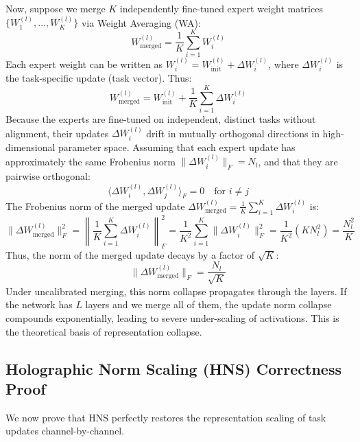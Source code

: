\documentclass{article}
\theoremstyle{plain}
\theoremstyle{definition}
\theoremstyle{remark}
\begin{document}
Now, suppose we merge $K$ independently fine-tuned expert weight matrices $\{W_1^{(l)}, \dots, W_K^{(l)}\}$ via Weight Averaging (WA):
\begin{equation}
  W_{\text{merged}}^{(l)} = \frac{1}{K} \sum_{i=1}^K W_i^{(l)}
\end{equation}
Each expert weight can be written as $W_i^{(l)} = W_{\text{init}}^{(l)} + \Delta W_i^{(l)}$, where $\Delta W_i^{(l)}$ is the task-specific update (task vector). Thus:
\begin{equation}
  W_{\text{merged}}^{(l)} = W_{\text{init}}^{(l)} + \frac{1}{K} \sum_{i=1}^K \Delta W_i^{(l)}
\end{equation}
Because the experts are fine-tuned on independent, distinct tasks without alignment, their updates $\Delta W_i^{(l)}$ drift in mutually orthogonal directions in high-dimensional parameter space. Assuming that each expert update has approximately the same Frobenius norm $\|\Delta W_i^{(l)}\|_F = N_l$, and that they are pairwise orthogonal:
\begin{equation}
  \langle \Delta W_i^{(l)}, \Delta W_j^{(l)} \rangle_F = 0 \quad \text{for } i \neq j
\end{equation}
The Frobenius norm of the merged update $\Delta W_{\text{merged}}^{(l)} = \frac{1}{K} \sum_{i=1}^K \Delta W_i^{(l)}$ is:
\begin{equation}
  \|\Delta W_{\text{merged}}^{(l)}\|_F^2 = \left\| \frac{1}{K} \sum_{i=1}^K \Delta W_i^{(l)} \right\|_F^2 = \frac{1}{K^2} \sum_{i=1}^K \|\Delta W_i^{(l)}\|_F^2 = \frac{1}{K^2} (K N_l^2) = \frac{N_l^2}{K}
\end{equation}
Thus, the norm of the merged update decays by a factor of $\sqrt{K}$:
\begin{equation}
  \|\Delta W_{\text{merged}}^{(l)}\|_F = \frac{N_l}{\sqrt{K}}
\end{equation}
Under uncalibrated merging, this norm collapse propagates through the layers. If the network has $L$ layers and we merge all of them, the update norm collapse compounds exponentially, leading to severe under-scaling of activations. This is the theoretical basis of representation collapse.

\subsection{Holographic Norm Scaling (HNS) Correctness Proof}
We now prove that HNS perfectly restores the representation scaling of task updates channel-by-channel.
\end{document}

